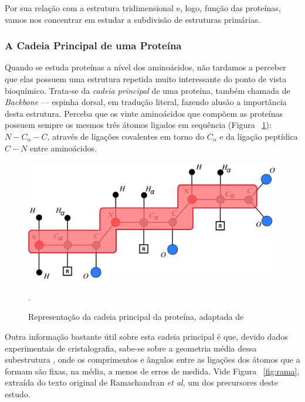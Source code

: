 \documentclass[a4paper,12pt]{article}
\begin{document}
	Por sua relação com a estrutura tridimensional e, logo, função das proteínas, vamos nos concentrar em estudar a subdivisão de estruturas primárias. 
	
	\subsubsection*{A Cadeia Principal de uma Proteína}
	Quando se estuda proteínas a nível dos aminoácidos, não tardamos a perceber que elas possuem uma estrutura repetida muito interessante do ponto de vista bioquímico. Trata-se da \textit{cadeia principal} de uma proteína, também chamada de \textit{Backbone} --- espinha dorsal, em tradução literal, fazendo alusão a importância desta estrutura. Perceba que os vinte aminoácidos que compõem as proteínas possuem sempre os mesmos três átomos ligados em sequência (Figura ~\ref{fig:backbone}): $N-C_\alpha-C$, através de ligações covalentes em torno do $C_\alpha$ e da ligação peptídica $C-N$ entre aminoácidos.
	
	\begin{figure}[H]
		\begin{center}
			\includegraphics[width=0.8\linewidth]{backbone.png}
		\end{center}
		\caption{Representação da cadeia principal da proteína, adaptada de  \cite{carlile:MinimalOrder}}.
		\label{fig:backbone}
	\end{figure}
	
	Outra informação bastante útil sobre esta cadeia principal é que, devido dados experimentais de cristalografia, sabe-se sobre a geometria média dessa subestrutura \cite{ramachandran1974MolStructure}, onde os comprimentos e ângulos entre  as ligações dos átomos que a formam são fixas, na média, a menos de erros de medida. Vide Figura ~\ref{fig:rama}, extraída do texto original de Ramachandran \textit{et al}, um dos precursores deste estudo.
	
\end{document}
